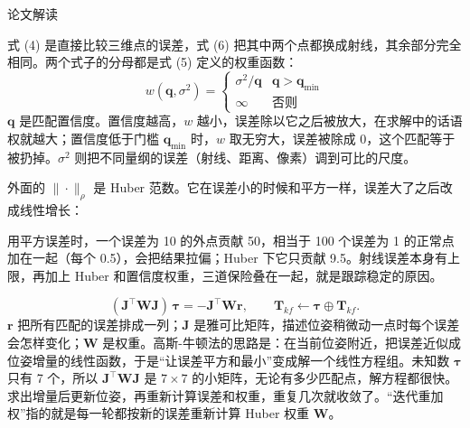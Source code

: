 \begin{interp}{论文解读}

式 (4) 是直接比较三维点的误差，式 (6) 把其中两个点都换成射线，其余部分完全相同。两个式子的分母都是式 (5) 定义的权重函数：
\[ w(\mathbf{q},\sigma^2)=\begin{cases}\sigma^2/\mathbf{q}&\mathbf{q}>\mathbf{q}_{\min}\\ \infty&\text{否则}\end{cases} \]
$\mathbf{q}$ 是匹配置信度。置信度越高，$w$ 越小，误差除以它之后被放大，在求解中的话语权就越大；置信度低于门槛 $\mathbf{q}_{\min}$ 时，$w$ 取无穷大，误差被除成 0，这个匹配等于被扔掉。$\sigma^2$ 则把不同量纲的误差（射线、距离、像素）调到可比的尺度。

外面的 $\|\cdot\|_\rho$ 是 Huber 范数。它在误差小的时候和平方一样，误差大了之后改成线性增长：

\begin{center}
\end{center}

用平方误差时，一个误差为 10 的外点贡献 50，相当于 100 个误差为 1 的正常点加在一起（每个 0.5），会把结果拉偏；Huber 下它只贡献 9.5。射线误差本身有上限，再加上 Huber 和置信度权重，三道保险叠在一起，就是跟踪稳定的原因。


\[ (\mathbf{J}^\top\mathbf{W}\mathbf{J})\,\boldsymbol{\tau}=-\mathbf{J}^\top\mathbf{W}\mathbf{r},\qquad \mathbf{T}_{kf}\leftarrow\boldsymbol{\tau}\oplus\mathbf{T}_{kf}. \]
$\mathbf{r}$ 把所有匹配的误差排成一列；$\mathbf{J}$ 是雅可比矩阵，描述位姿稍微动一点时每个误差会怎样变化；$\mathbf{W}$ 是权重。高斯-牛顿法的思路是：在当前位姿附近，把误差近似成位姿增量的线性函数，于是“让误差平方和最小”变成解一个线性方程组。未知数 $\boldsymbol{\tau}$ 只有 7 个，所以 $\mathbf{J}^\top\mathbf{W}\mathbf{J}$ 是 $7\times7$ 的小矩阵，无论有多少匹配点，解方程都很快。求出增量后更新位姿，再重新计算误差和权重，重复几次就收敛了。“迭代重加权”指的就是每一轮都按新的误差重新计算 Huber 权重 $\mathbf{W}$。


\end{interp}

